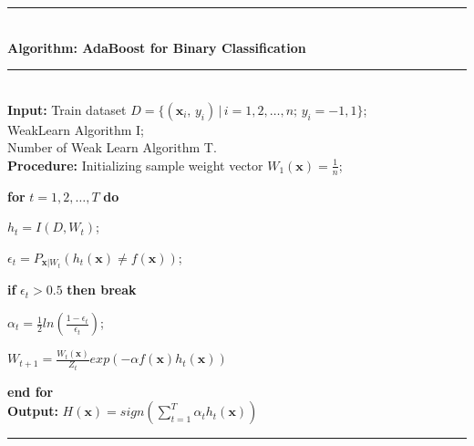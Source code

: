 \documentclass[a4paper]{article}
\begin{document}
			\noindent\rule[0.1\baselineskip]{\textwidth}{0.75pt}\\
			\textbf{Algorithm: AdaBoost for Binary Classification}\\
			\noindent\rule[0.1\baselineskip]{\textwidth}{0.5pt}\\
			\textbf{Input:} Train dataset $D = \{(\textbf{x}_i,\,y_i)\,|\,i = 1, 2,\dots, n;\, y_i = -1, 1\}$;\\
			\hspace*{32pt} WeakLearn Algorithm I;\\
			\hspace*{32pt} Number of Weak Learn Algorithm T.\\
			\textbf{Procedure:} 
					\hspace*{2pt} Initializing sample weight vector $W_1(\textbf{x}) = \frac{1}{n}$;\par
					\hspace*{32pt} \textbf{for} $t = 1, 2,\dots, T$ \textbf{do}\par
							\hspace*{48pt} $h_t = I(D, W_t)$;\par
							\hspace*{48pt} $\epsilon_t = P_{\textbf{x}|W_t}(h_t(\textbf{x}) \neq f(\textbf{x}))$;\par
							\hspace*{48pt} \textbf{if} $\epsilon_t > 0.5$ \textbf{then break}\par
							\hspace*{48pt} $\alpha_t = \frac{1}{2}ln(\frac{1-\epsilon_t}{\epsilon_t})$;\par
							\hspace*{48pt} $W_{t+1} = \frac{W_t(\textbf{x})}{Z_t}exp(-\alpha f(\textbf{x})h_t(\textbf{x}))$\par
					\hspace*{32pt}\textbf{end for}\\
			\textbf{Output:} $H(\textbf{x}) = sign(\sum_{t=1}^{T}\alpha_th_t(\textbf{x}))$\par
			\noindent\rule[0.25\baselineskip]{\textwidth}{0.75pt}\par
\end{document}
